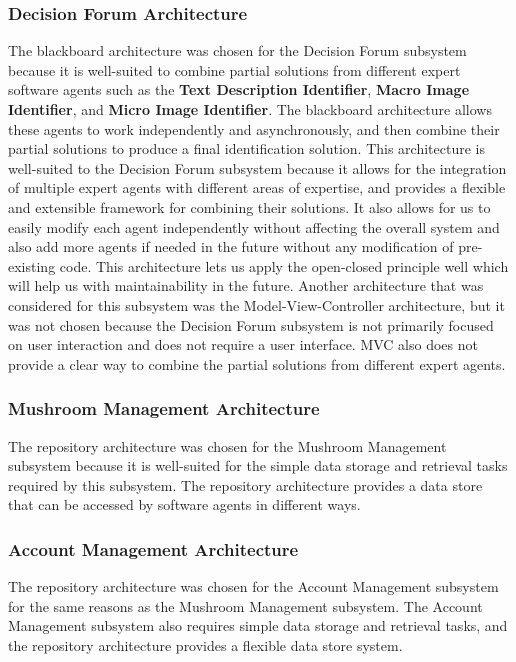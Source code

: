 \documentclass[]{article}
\begin{document}
\subsubsection{Decision Forum Architecture}

The blackboard architecture was chosen for the Decision Forum subsystem because it is well-suited
to combine partial solutions from different expert software agents such as the \textbf{Text Description Identifier},
\textbf{Macro Image Identifier}, and \textbf{Micro Image Identifier}. The blackboard architecture
allows these agents to work independently and asynchronously, and then combine their partial 
solutions to produce a final identification solution. This architecture is well-suited to the 
Decision Forum subsystem because it allows for the integration of multiple expert agents with 
different areas of expertise, and provides a flexible and extensible framework for combining 
their solutions. It also allows for us to easily modify each agent independently without affecting
the overall system and also add more agents if needed in the future without any modification of pre-existing
code. This architecture lets us apply the open-closed principle well which will help us with maintainability
in the future. Another architecture that was considered for this subsystem was the Model-View-Controller
architecture, but it was not chosen because the Decision Forum subsystem is not primarily focused on user
interaction and does not require a user interface. MVC also does not provide a clear way to combine
the partial solutions from different expert agents.

\subsubsection{Mushroom Management Architecture}

The repository architecture was chosen for the Mushroom Management subsystem because it is well-suited
for the simple data storage and retrieval tasks required by this subsystem. The repository architecture
provides a data store that can be accessed by software agents in different ways.

\subsubsection{Account Management Architecture}

The repository architecture was chosen for the Account Management subsystem for the same reasons 
as the Mushroom Management subsystem. The Account Management subsystem also requires simple data
storage and retrieval tasks, and the repository architecture provides a flexible data store 
system.
\end{document}
